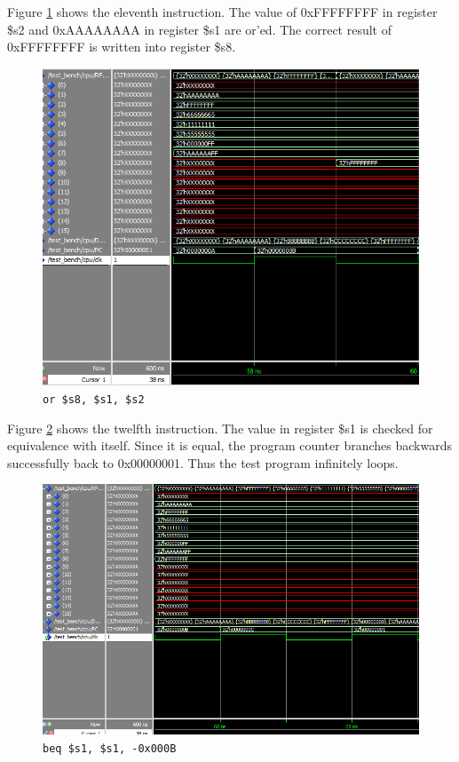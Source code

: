 \documentclass[12pt]{article}
\begin{document}
Figure \ref{fig:11-instr} shows the eleventh instruction. The value of 0xFFFFFFFF in register \$s2 and 0xAAAAAAAA in register \$s1 are or'ed. The correct result of 0xFFFFFFFF is written into register \$s8.
\begin{figure}[h!]
\centering
\includegraphics[width=\linewidth]{simulation/11-instr}
\caption{\texttt{or \$s8, \$s1, \$s2}}
\label{fig:11-instr}
\end{figure}
\clearpage

Figure \ref{fig:12-instr} shows the twelfth instruction. The value in register \$s1 is checked for equivalence with itself. Since it is equal, the program counter branches backwards successfully back to 0x00000001. Thus the test program infinitely loops. 
\begin{figure}[h!]
\centering
\includegraphics[width=\linewidth]{simulation/12-instr}
\caption{\texttt{beq \$s1, \$s1, -0x000B}}
\label{fig:12-instr}
\end{figure}
\end{document}
